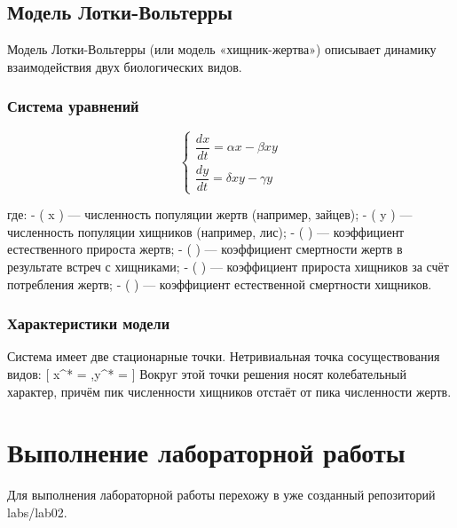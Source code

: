\documentclass[
  12pt,
  a4paper,
  DIV=11,
  numbers=noendperiod]{scrreprt}
\begin{document}
\section{Модель
Лотки-Вольтерры}\label{ux43cux43eux434ux435ux43bux44c-ux43bux43eux442ux43aux438-ux432ux43eux43bux44cux442ux435ux440ux440ux44b}

Модель Лотки-Вольтерры (или модель «хищник-жертва») описывает динамику
взаимодействия двух биологических видов.

\subsection{Система
уравнений}\label{ux441ux438ux441ux442ux435ux43cux430-ux443ux440ux430ux432ux43dux435ux43dux438ux439}

\[
\begin{cases}
\dfrac{dx}{dt} = \alpha x - \beta x y \\[1em]
\dfrac{dy}{dt} = \delta x y - \gamma y
\end{cases}
\]

где: - ( x ) --- численность популяции жертв (например, зайцев); - ( y )
--- численность популяции хищников (например, лис); - ( \alpha ) ---
коэффициент естественного прироста жертв; - ( \beta ) --- коэффициент
смертности жертв в результате встреч с хищниками; - ( \delta ) ---
коэффициент прироста хищников за счёт потребления жертв; - ( \gamma )
--- коэффициент естественной смертности хищников.

\subsection{Характеристики
модели}\label{ux445ux430ux440ux430ux43aux442ux435ux440ux438ux441ux442ux438ux43aux438-ux43cux43eux434ux435ux43bux438}

Система имеет две стационарные точки. Нетривиальная точка
сосуществования видов: {[} x\^{}* = \frac{\gamma}{\delta},\quad y\^{}* =
\frac{\alpha}{\beta} {]} Вокруг этой точки решения носят колебательный
характер, причём пик численности хищников отстаёт от пика численности
жертв.

\chapter{Выполнение лабораторной
работы}\label{ux432ux44bux43fux43eux43bux43dux435ux43dux438ux435-ux43bux430ux431ux43eux440ux430ux442ux43eux440ux43dux43eux439-ux440ux430ux431ux43eux442ux44b}

Для выполнения лабораторной работы перехожу в уже созданный репозиторий
labs/lab02.
\end{document}
